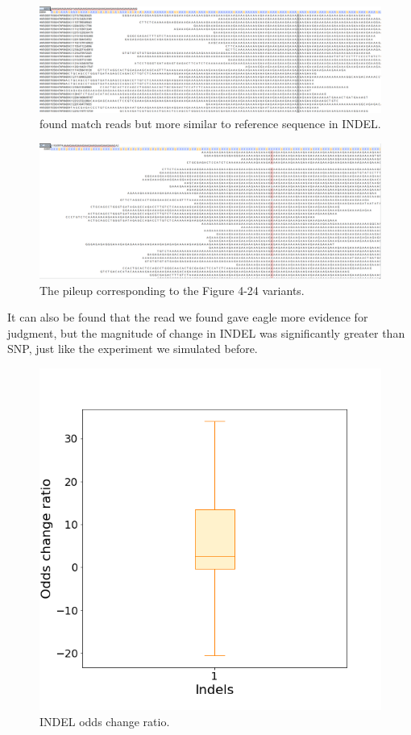 \begin{figure}[H]
    \centering
    \includegraphics[width=1\columnwidth]{body/image/4-24.png}
    \captionsetup{labelfont=bf}
    \renewcommand{\baselinestretch}{1.0}
    \vspace{-1cm}
    \caption[INDEL worse match reads]{ found match reads but more similar to reference sequence in INDEL.}
    \label{f4-24}
\end{figure}

\vspace{0.5cm}
\begin{figure}[H]
    \centering
    \includegraphics[width=1\columnwidth]{body/image/4-25.png}
    \captionsetup{labelfont=bf}
    \renewcommand{\baselinestretch}{1.0}
    \vspace{-1cm}
    \caption[Figure 4.24 pileup]{The pileup corresponding to the Figure 4-24 variants.}
    \label{f4-25}
\end{figure}

It can also be found that the read we found gave eagle more evidence for judgment, but the magnitude of change in INDEL was significantly greater than SNP, just like the experiment we simulated before.

\begin{figure}[H]
    \centering
    \includegraphics[width=0.6\columnwidth]{body/image/4-26.png}
    \captionsetup{labelfont=bf}
    \renewcommand{\baselinestretch}{1.0}
    \caption[INDEL odds change ratio]{INDEL odds change ratio.}
    \label{f4-26}
\end{figure}

